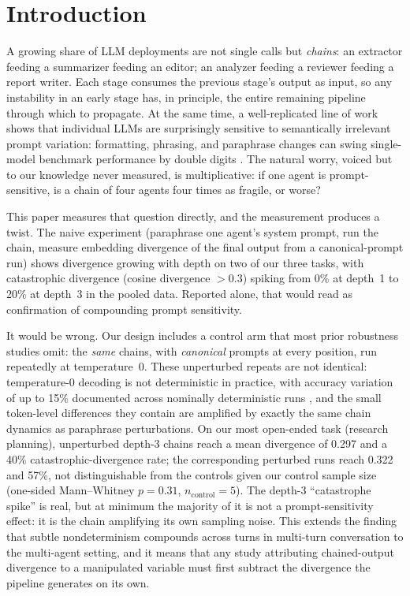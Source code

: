 \documentclass[11pt]{article}
\begin{document}
\section{Introduction}

A growing share of LLM deployments are not single calls but \emph{chains}:
an extractor feeding a summarizer feeding an editor; an analyzer feeding a
reviewer feeding a report writer. Each stage consumes the previous stage's
output as input, so any instability in an early stage has, in principle, the
entire remaining pipeline through which to propagate. At the same time, a
well-replicated line of work shows that individual LLMs are surprisingly
sensitive to semantically irrelevant prompt variation: formatting,
phrasing, and paraphrase changes can swing single-model benchmark
performance by double digits
\citep{sclar2024,zhu2023,mizrahi2024,sun2023,cao2024}. The natural worry,
voiced but to our knowledge never measured, is multiplicative: if one agent
is prompt-sensitive, is a chain of four agents four times as fragile, or
worse?

This paper measures that question directly, and the measurement produces a
twist. The naive experiment (paraphrase one agent's system prompt, run the
chain, measure embedding divergence of the final output from a
canonical-prompt run) shows divergence growing with depth on two of our
three tasks, with catastrophic divergence (cosine divergence $>0.3$) spiking
from 0\% at depth~1 to 20\% at depth~3 in the pooled data. Reported alone,
that would read as confirmation of compounding prompt sensitivity.

It would be wrong. Our design includes a control arm that most prior
robustness studies omit: the \emph{same} chains, with \emph{canonical}
prompts at every position, run repeatedly at temperature~0. These
unperturbed repeats are not identical: temperature-0 decoding is not
deterministic in practice, with accuracy variation of up to 15\% documented
across nominally deterministic runs \citep{atil2024,ouyang2023,he2025}, and
the small token-level differences they contain are amplified by exactly the
same chain dynamics as paraphrase perturbations. On our most open-ended task
(research planning), unperturbed depth-3 chains reach a mean divergence of
0.297 and a 40\% catastrophic-divergence rate; the corresponding perturbed
runs reach 0.322 and 57\%, not distinguishable from the controls given our
control sample size (one-sided Mann--Whitney $p = 0.31$,
$n_{\mathrm{control}} = 5$). The depth-3 ``catastrophe spike'' is real, but
at minimum the majority of it is not a prompt-sensitivity effect: it is the
chain amplifying its own sampling noise. This extends the finding that
subtle nondeterminism compounds across turns in multi-turn conversation
\citep{laban2025} to the multi-agent setting, and it means that any study
attributing chained-output divergence to a manipulated variable must first
subtract the divergence the pipeline generates on its own.
\end{document}
